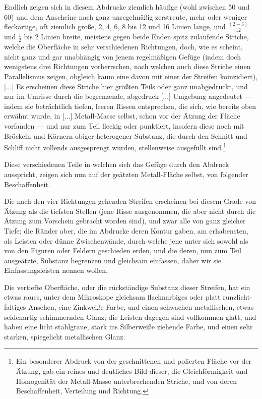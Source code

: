\documentclass[a4paper, 11pt, oneside, german]{article}
\begin{document}
Endlich zeigen sich in diesem Abdrucke ziemlich häufige (wohl zwischen 50 und 60) und dem Anscheine nach ganz unregelmäßig zerstreute, mehr oder weniger fleckartige, oft ziemlich große, 2, 4, 6, 8 bis 12 und 16 Linien lange, und $\frac{(2-3)}{12}$ und $\frac{1}{2}$ bis 2 Linien breite, meistens gegen beide Enden spitz zulaufende Striche, welche die Oberfläche in sehr verschiedenen Richtungen, doch, wie es scheint, nicht ganz und gar unabhängig von jenem regelmäßigen Gefüge (indem doch wenigstens drei Richtungen vorherrschen, nach welchen auch diese Striche einen Parallelismus zeigen, obgleich kaum eine davon mit einer der Streifen koinzidiert), [...] Es erscheinen diese Striche hier größten Teils oder ganz unabgedruckt, und nur im Umrisse durch die begrenzende, abgedruck [...] Umgebung angedeutet --- indem sie beträchtlich tiefen, leeren Rissen entsprechen, die sich, wie bereits oben erwähnt wurde, in [...] Metall-Masse selbst, schon vor der Ätzung der Fläche vorfanden --- und nur zum Teil fleckig oder punktiert, insofern diese noch mit Bröckeln und Körnern obiger heterogener Substanz, die durch den Schnitt und Schliff nicht vollends ausgesprengt wurden, stellenweise ausgefüllt sind.\footnote{Ein besonderer Abdruck von der geschnittenen und polierten Fläche vor der Ätzung, gab ein reines und deutliches Bild dieser, die Gleichförmigkeit und Homogenität der Metall-Masse unterbrechenden Striche, und von deren Beschaffenheit, Verteilung und Richtung.}

Diese verschiedenen Teile in welchen sich das Gefüge durch den Abdruck ausspricht, zeigen sich nun auf der geätzten Metall-Fläche selbst, von folgender Beschaffenheit.

Die nach den vier Richtungen gehenden Streifen erscheinen bei diesem Grade von Ätzung als die tiefsten Stellen (jene Risse ausgenommen, die aber nicht durch die Ätzung zum Vorschein gebracht worden sind), und zwar alle von ganz gleicher Tiefe; die Ränder aber, die im Abdrucke deren Kontur gaben, am erhabensten, als Leisten oder dünne Zwischenwände, durch welche jene unter sich sowohl als von den Figuren oder Feldern geschieden erden, und die deren, nun zum Teil ausgeätzte, Substanz begrenzen und gleichsam einfassen, daher wir sie Einfassungsleisten nennen wollen.

Die vertiefte Oberfläche, oder die rückständige Substanz dieser Streifen, hat ein etwas raues, unter dem Mikroskope gleichsam flachnarbiges oder platt runzlicht-faltiges Ansehen, eine Zinkweiße Farbe, und einen schwachen metallischen, etwas seidenartig schimmernden Glanz; die Leisten dagegen sind vollkommen glatt, und haben eine licht stahlgraue, stark ins Silberweiße ziehende Farbe, und einen sehr starken, spiegelicht metallischen Glanz.
\end{document}
